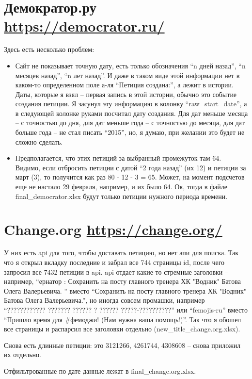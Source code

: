 \documentclass[11pt, a4paper]{article}
\begin{document}
\section*{Демократор.ру \url{https://democrator.ru/}}
Здесь есть несколько проблем:
\begin{itemize}
	\item Сайт не показывает точную дату, есть только обозначения ``n дней назад'', ``n месяцев назад'', ``n лет назад''.
	И даже в таком виде этой информации нет в каком-то определенном поле а-ля ``Петиция создана:'', а лежит в истории. Даты, которые я взял -- первая запись в этой истории, обычно это событие создания петиции. 
	Я засунул эту информацию в колонку ``raw\_start\_date'', а в следующей колонке руками посчитал дату создания. Для дат меньше месяца -- с точностью до дня, для дат меньше года -- с точностью до месяца, для дат больше года -- не стал писать ``2015'', но, я думаю, при желании это будет не сложно сделать.
	\item Предполагается, что этих петиций за выбранный промежуток там 64. Видимо, если отбросить петиции с датой ``2 года назад'' (их 12) и петиции за март (3), то получится как раз 80 - 12 - 3 = 65. Может, на момент подсчетов еще не настало 29 февраля, например, и их было 64. Ок, тогда в файле final\_democrator.xlsx будут только петиции нужного периода времени.
\end{itemize}

\section*{Change.org \url{https://change.org/}}
У них есть api для того, чтобы доставать петицию, но нет апи для поиска.
Так что я открыл вкладку последние и забрал все 744 страницы id, после чего запросил все 7432 петиции в api.
api отдает какие-то стремные заголовки -- например, ``ернатор : Сохранить на посту главного тренера ХК "Водник" Батова Олега Валерьевича.
'' вместо ``Сохранить на посту главного тренера ХК "Водник" Батова Олега Валерьевича.'', но иногда совсем промашки, например ``???????????? ??????? ?????? ? ?????? ?????-??????????'' или ``femojis-ru'' вместо ``Пришло время для \#фемоджи! (Нам нужна ваша помощь!)''. Так что я обошел все страницы и распарсил все заголовки отдельно (new\_title\_change.org.xlsx).

Снова есть длинные петиции: это 3121266, 4261744, 4308608 -- снова приложил их отдельно.

Отфильтрованные по дате данные лежат в final\_change.org.xlsx.
\end{document}
